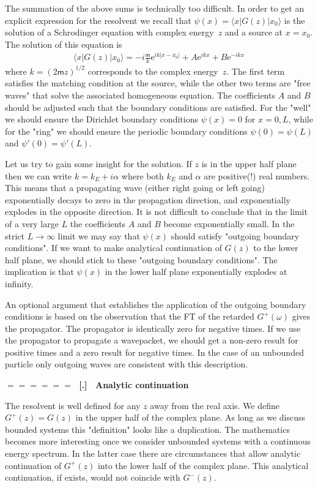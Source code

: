 \documentclass[onecolumn,fleqn]{revtex4}
\newcommand{\eexp}{\mathrm{e}^}
\newcommand{\mass}{\mathsf{m}}
\newcommand{\beq}{\begin{eqnarray}}
\newcommand{\eeq}{\end{eqnarray}}
\renewcommand{\thesubsection}{\arabic{subsection}}
\renewcommand{\thesubsubsection}{\arabic{subsubsection}}
\newcommand{\sheadC}[1]
{
\addtocounter{subsubsection}{1}
\vspace{5mm}
{\Large\bf $=\!=\!=\!=\!=\!=\;$ [\thesubsection.\thesubsubsection] \ #1}  
\nopagebreak
\phantomsection
}
\begin{document}
The summation of the above sums 
is technically too difficult.  
In order to get an explicit 
expression for the resolvent 
we recall that ${\psi(x)=\langle x|G(z)|x_0 \rangle}$ 
is the solution of a Schrodinger 
equation with complex energy~$z$ 
and a source at ${x=x_0}$. 
The solution of this equation is 
\beq
\langle x|G(z)|x_0\rangle = -i\frac{\mass}{k}\eexp{ik|x-x_0|} + A \eexp{ikx} + B \eexp{-ikx} 
\eeq
where $k=(2\mass z)^{1/2}$ corresponds to the complex 
energy~$z$. The first term satisfies the matching 
condition at the source, while 
the other two terms are "free waves" 
that solve the associated homogeneous equation. 
The coefficients $A$ and $B$ should be adjusted 
such that the boundary conditions are satisfied. 
For the "well" we should ensure 
the Dirichlet boundary conditions $\psi(x)=0$ for $x=0,L$,  
while for the "ring" we should ensure 
the periodic boundary conditions $\psi(0)=\psi(L)$ 
and $\psi'(0)=\psi'(L)$.
 

Let us try to gain some insight for the solution.
If $z$ is in the upper half plane then we can write 
$k = k_E + i\alpha$ where both $k_E$ and $\alpha$ are 
positive(!) real numbers.  
This means that a propagating wave (either right going 
or left going)  exponentially decays to zero 
in the propagation direction, 
and exponentially explodes in the opposite direction. 
It is not difficult to conclude that in the limit 
of a very large $L$ the coefficients $A$ and $B$ 
become exponentially small. In the strict 
$L\rightarrow \infty$ limit we may say that $\psi(x)$ 
should satisfy "outgoing boundary conditions".  
If we want to make analytical continuation of $G(z)$ 
to the lower half plane, we should stick to these  
"outgoing boundary conditions". The implication is that 
$\psi(x)$ in the lower half plane exponentially 
explodes at infinity.

An optional argument that establishes the application 
of the outgoing boundary conditions is based 
on the observation that the FT of the retarded $G^{+}(\omega)$
gives the propagator. The propagator is identically 
zero for negative times. If we use the propagator 
to propagate a wavepacket, we should get a non-zero result 
for positive times and a zero result for negative times. 
In the case of an unbounded particle only outgoing waves are 
consistent with this description.  




\sheadC{Analytic continuation}


The resolvent is well defined for any $z$ away 
from the real axis. We define $G^{+}(z) = G(z)$  
in the upper half of the complex plane. 
As long as we discuss bounded systems this "definition" 
looks like a duplication. The mathematics becomes 
more interesting once we consider unbounded systems 
with a continuous energy spectrum.
In the latter case there are circumstances that allow 
analytic continuation of $G^{+}(z)$ into the lower half 
of the complex plane.
This analytical continuation, if exists, would not  
coincide with $G^{-}(z)$. 
\end{document}
